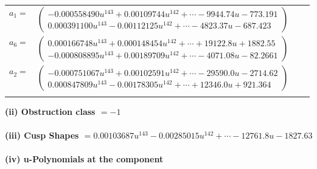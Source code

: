 \documentclass[1p]{elsarticle_modified}
\theoremstyle{definition}
\begin{document}
\begin{tabular}{m{7pt} m{180pt} m{7pt} m{180pt} }
\flushright $a_{1}=$&$\begin{pmatrix}-0.000558490 u^{143}+0.00109744 u^{142}+\cdots-9944.74 u-773.191\\0.000391100 u^{143}-0.00112125 u^{142}+\cdots-4823.37 u-687.423\end{pmatrix}$ \\
\flushright $a_{6}=$&$\begin{pmatrix}0.000166748 u^{143}+0.000148454 u^{142}+\cdots+19122.8 u+1882.55\\-0.000808895 u^{143}+0.00189709 u^{142}+\cdots-4071.08 u-82.2661\end{pmatrix}$ \\
\flushright $a_{2}=$&$\begin{pmatrix}-0.000751067 u^{143}+0.00102591 u^{142}+\cdots-29590.0 u-2714.62\\0.000847809 u^{143}-0.00178305 u^{142}+\cdots+12346.0 u+921.364\end{pmatrix}$\\&\end{tabular}
\flushleft \textbf{(ii) Obstruction class $= -1$}\\~\\
\flushleft \textbf{(iii) Cusp Shapes $= 0.00103687 u^{143}-0.00285015 u^{142}+\cdots-12761.8 u-1827.63$}\\~\\
\newpage\renewcommand{\arraystretch}{1}
\flushleft \textbf{(iv) u-Polynomials at the component}\newline \\
\end{document}
